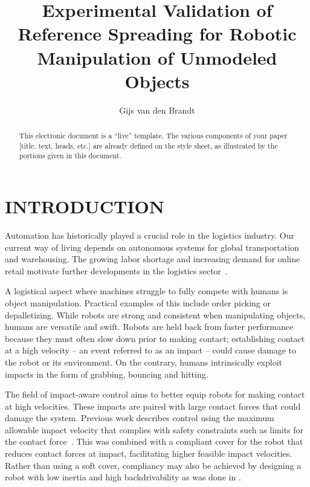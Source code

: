 \documentclass[a4paper, 10pt, conference]{ieeeconf}
\title{\LARGE \bf
    Experimental Validation of Reference Spreading for Robotic Manipulation of Unmodeled Objects
    }
\author{Gijs van den Brandt%
    }
\begin{document}
    \maketitle
    \thispagestyle{empty}
    \pagestyle{empty}

    \begin{abstract}

    This electronic document is a ``live'' template. The various components of your paper [title, text, heads, etc.] are already defined on the style sheet, as illustrated by the portions given in this document.

    \end{abstract}

    \section{INTRODUCTION}

    Automation has historically played a crucial role in the logistics industry. Our current way of living depends on autonomous systems for global transportation and warehousing. The growing labor shortage and increasing demand for online retail motivate further developments in the logistics sector~\cite{dekhneAutomationLogisticsBig2019}.

    A logistical aspect where machines struggle to fully compete with humans is object manipulation. Practical examples of this include order picking or depalletizing. While robots are strong and consistent when manipulating objects, humans are versatile and swift. Robots are held back from faster performance because they must often slow down prior to making contact; establishing contact at a high velocity -- an event referred to as an impact -- could cause damage to the robot or its environment. On the contrary, humans intrinsically exploit impacts in the form of grabbing, bouncing and hitting.

    The field of impact-aware control aims to better equip robots for making contact at high velocities. These impacts are paired with large contact forces that could damage the system. Previous work describes control using the maximum allowable impact velocity that complies with safety constraints such as limits for the contact force~\cite{dehioRobotSafeImpactsSoft2021, dehioDualArmBoxGrabbing2022}. This was combined with a compliant cover for the robot that reduces contact forces at impact, facilitating higher feasible impact velocities. Rather than using a soft cover, compliancy may also be achieved by designing a robot with low inertia and high backdrivability as was done in \cite{songDevelopmentLowInertiaHighStiffness2018}.
\end{document}

